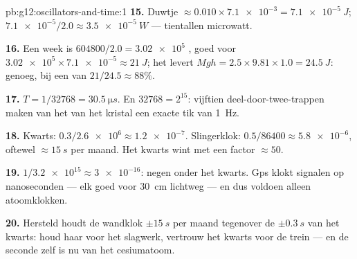 \begin{solution}{pb:g12:oscillators-and-time:1}
\textbf{15.} Duwtje $\approx 0.010 \times \num{7.1e-3} = \qty{7.1e-5}{J}$;
 $\num{7.1e-5}/2.0 \approx \qty{3.5e-5}{W}$ --- tientallen
microwatt.

\textbf{16.} Een week is $604800/2.0 = \num{3.02e5}$ , goed voor
$\num{3.02e5} \times \num{7.1e-5} \approx \qty{21}{J}$; het  levert
$Mgh = 2.5 \times 9.81 \times 1.0 = \qty{24.5}{J}$: genoeg, bij een 
van $21/24.5 \approx 88\%$.

\textbf{17.} $T = 1/\num{32768} = \qty{30.5}{\micro s}$. En
$\num{32768} = 2^{15}$: vijftien deel-door-twee-trappen maken van het 
van het kristal een exacte tik van \qty{1}{Hz}.

\textbf{18.} Kwarts: $0.3/\num{2.6e6} \approx \num{1.2e-7}$. Slingerklok:
$0.5/86400 \approx \num{5.8e-6}$, oftewel $\approx \qty{15}{s}$ per maand.
Het kwarts wint met een factor $\approx 50$.

\textbf{19.} $1/\num{3.2e15} \approx \num{3e-16}$: negen  onder
het kwarts. Gps klokt signalen op nanoseconden --- elk goed voor \qty{30}{cm}
lichtweg --- en dus voldoen alleen atoomklokken.

\textbf{20.} Hersteld houdt de wandklok $\pm\qty{15}{s}$ per maand tegenover
de $\pm\qty{0.3}{s}$ van het kwarts: houd haar voor het slagwerk, vertrouw
het kwarts voor de trein --- en de seconde zelf is nu van het cesiumatoom.
\end{solution}
